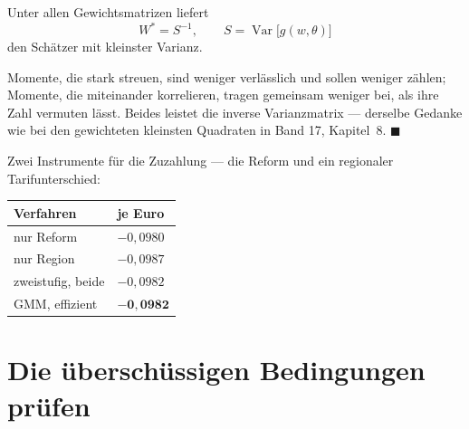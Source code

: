 \begin{merksatz}
Unter allen Gewichtsmatrizen liefert
\[ W^{*} = S^{-1}, \qquad S = \operatorname{Var}\bigl[g(w,\theta)\bigr] \]
den Schätzer mit kleinster Varianz.

Momente, die stark streuen, sind weniger verlässlich und sollen weniger zählen; Momente, die miteinander korrelieren, tragen gemeinsam weniger bei, als ihre Zahl vermuten lässt. Beides leistet die inverse Varianzmatrix --- derselbe Gedanke wie bei den gewichteten kleinsten Quadraten in Band 17, Kapitel~8. $\blacksquare$

\begin{center}
\begin{minipage}{0.88\textwidth}
\end{minipage}
\end{center}

Zwei Instrumente für die Zuzahlung --- die Reform und ein regionaler Tarifunterschied:

\begin{center}
{\small
\renewcommand{\arraystretch}{1.48}
\begin{tabular}{@{}P{3.4cm}P{2.4cm}@{}}
\toprule
\textbf{Verfahren} & \textbf{je Euro}\\
\midrule
nur Reform & $-0{,}0980$\\
nur Region & $-0{,}0987$\\
zweistufig, beide & $-0{,}0982$\\
GMM, effizient & $\mathbf{-0{,}0982}$\\
\bottomrule
\end{tabular}}
\end{center}
\end{merksatz}

\section{Die überschüssigen Bedingungen prüfen}


